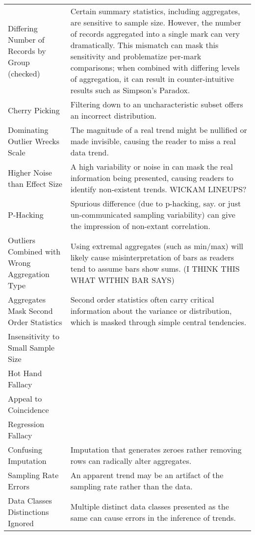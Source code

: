 \begin{longtable}{p{5cm}p{12cm}}
   \rowcolor{colorb}Differing Number of Records by Group (checked) & Certain summary statistics, including aggregates, are sensitive to sample size. However, the number of records aggregated into a single mark can very dramatically. This mismatch can mask this sensitivity and problematize per-mark comparisons; when combined with differing levels of aggregation, it can result in counter-intuitive results such as Simpson's Paradox. \cite{guo2017you}\\
 \rowcolor{colorb-opaque}Cherry Picking & Filtering down to an uncharacteristic subset offers an incorrect distribution. \cite{few2019loom}\\
 \rowcolor{colorb}Dominating Outlier Wrecks Scale & The magnitude of a real trend might be nullified or made invisible, causing the reader to miss a real data trend.  \cite{kindlmann2014algebraic}\\
 \rowcolor{colorb-opaque}Higher Noise than Effect Size & A high variability or noise in can mask the real information being presented, causing readers to identify non-existent trends. WICKAM LINEUPS?\\
 \rowcolor{colorb}P-Hacking & Spurious difference (due to p-hacking, say. or just un-communicated sampling variability) can give the impression of non-extant correlation. \cite{pu2018garden}\\
 \rowcolor{colorb-opaque}Outliers Combined with Wrong Aggregation Type & Using extremal aggregates (such as min/max) will likely cause misinterpretation of bars as readers tend to assume bars show sums. (I THINK THIS WHAT WITHIN BAR SAYS) \cite{newman2012bar}\\
 \rowcolor{colorb}Aggregates Mask Second Order Statistics & Second order statistics often carry critical information about the variance or distribution, which is masked through simple central tendencies.  \cite{wall2017warning, few2019loom, matejka2017same, anscombe1973graphs}\\
 \rowcolor{colorb-opaque}Insensitivity to Small Sample Size &  \cite{few2019loom}\\
 \rowcolor{colorb}Hot Hand Fallacy &  \cite{few2019loom}\\
 \rowcolor{colorb-opaque}Appeal to Coincidence &  \cite{few2019loom}\\
 \rowcolor{colorb}Regression Fallacy &  \cite{few2019loom}\\
 \rowcolor{colorb-opaque}Confusing Imputation & Imputation that generates zeroes rather removing rows can radically alter aggregates. \cite{song2018s}\\
 \rowcolor{colorb}Sampling Rate Errors  & An apparent trend may be an artifact of the sampling rate rather than the data. \cite{kindlmann2014algebraic}\\
 \rowcolor{colorb-opaque}Data Classes Distinctions Ignored & Multiple distinct data classes presented as the same can cause errors in the inference of trends. \cite{anand2015automatic}\\


\end{longtable}
